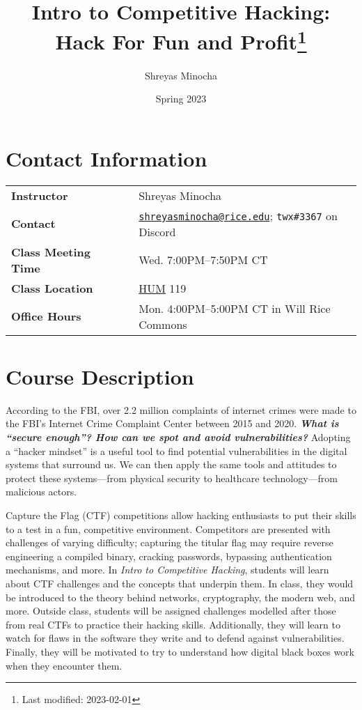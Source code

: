 \documentclass[11pt]{article}
\title{Intro to Competitive Hacking: Hack For Fun and Profit\footnote{Last modified: 2023-02-01}}
\author{Shreyas Minocha}
\date{Spring 2023}
\begin{document}
\maketitle

\begin{flushleft}
\section{Contact Information}\label{contact-information}

\setlength{\tabcolsep}{0pt}
\begin{tabular}{ll}
\textbf{Instructor} & Shreyas Minocha \\
\textbf{Contact} & \href{mailto:shreyasminocha@rice.edu}{\texttt{shreyasminocha@rice.edu}}; \texttt{twx\#3367} on Discord\\
\textbf{Class Meeting Time}~~~~~ & Wed. 7:00PM--7:50PM CT \\
\textbf{Class Location} & \href{https://www.openstreetmap.org/node/8379958483}{HUM} 119 \\
\textbf{Office Hours} & Mon. 4:00PM--5:00PM CT in Will Rice Commons
\end{tabular}
\setlength{\tabcolsep}{6pt}

\section{Course Description}\label{course-description}

According to the FBI, over 2.2 million complaints of internet crimes were made to the FBI's Internet Crime Complaint Center between 2015 and 2020. \textit{\textbf{What is ``secure enough''? How can we spot and avoid vulnerabilities?}} Adopting a ``hacker mindset'' is a useful tool to find potential vulnerabilities in the digital systems that surround us. We can then apply the same tools and attitudes to protect these systems—from physical security to healthcare technology—from malicious actors.

Capture the Flag (CTF) competitions allow hacking enthusiasts to put their skills to a test in a fun, competitive environment. Competitors are presented with challenges of varying difficulty; capturing the titular flag may require reverse engineering a compiled binary, cracking passwords, bypassing authentication mechanisms, and more. In \textit{Intro to Competitive Hacking}, students will learn about CTF challenges and the concepts that underpin them. In class, they would be introduced to the theory behind networks, cryptography, the modern web, and more. Outside class, students will be assigned challenges modelled after those from real CTFs to practice their hacking skills. Additionally, they will learn to watch for flaws in the software they write and to defend against vulnerabilities. Finally, they will be motivated to try to understand how digital black boxes work when they encounter them.


\end{flushleft}
\end{document}
